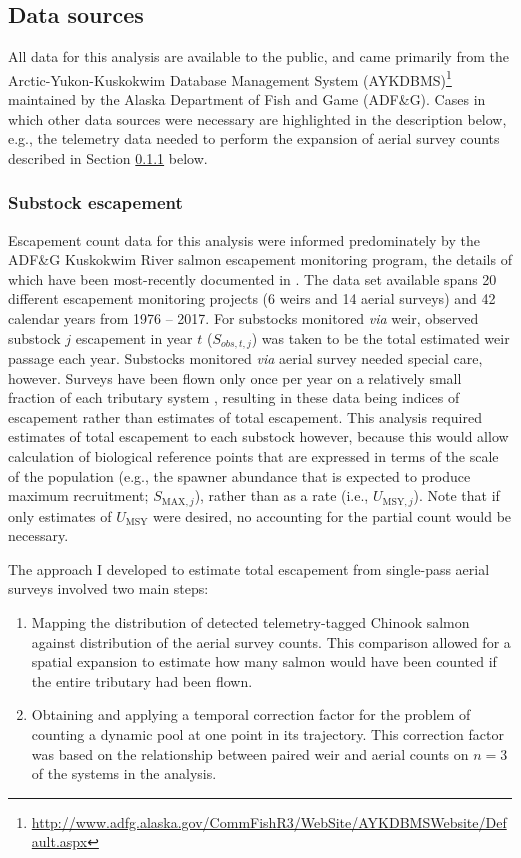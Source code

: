 \documentclass[12pt,]{book}
\let\rmarkdownfootnote\footnote%
\def\footnote{\protect\rmarkdownfootnote}
\theoremstyle{definition}
\theoremstyle{definition}
\theoremstyle{definition}
\theoremstyle{remark}
\begin{document}
\subsection{Data sources}\label{data-sources}

All data for this analysis are available to the public, and came
primarily from the Arctic-Yukon-Kuskokwim Database Management System
(AYKDBMS)\footnote{\url{http://www.adfg.alaska.gov/CommFishR3/WebSite/AYKDBMSWebsite/Default.aspx}}
maintained by the Alaska Department of Fish and Game (ADF\&G). Cases in
which other data sources were necessary are highlighted in the
description below, e.g., the telemetry data needed to perform the
expansion of aerial survey counts described in Section
\ref{air-expansion} below.

\subsubsection{Substock escapement}\label{air-expansion}

\noindent
Escapement count data for this analysis were informed predominately by
the ADF\&G Kuskokwim River salmon escapement monitoring program, the
details of which have been most-recently documented in
\citep{head-liller-2017}. The data set available spans 20 different
escapement monitoring projects (6 weirs and 14 aerial surveys) and 42
calendar years from 1976 -- 2017. For substocks monitored \emph{via}
weir, observed substock \(j\) escapement in year \(t\) (\(S_{obs,t,j}\))
was taken to be the total estimated weir passage each year. Substocks
monitored \emph{via} aerial survey needed special care, however. Surveys
have been flown only once per year on a relatively small fraction of
each tributary system \citep{head-liller-2017}, resulting in these data
being indices of escapement rather than estimates of total escapement.
This analysis required estimates of total escapement to each substock
however, because this would allow calculation of biological reference
points that are expressed in terms of the scale of the population (e.g.,
the spawner abundance that is expected to produce maximum recruitment;
\(S_{\text{MAX},j}\)), rather than as a rate (i.e.,
\(U_{\text{MSY},j}\)). Note that if only estimates of \(U_{\text{MSY}}\)
were desired, no accounting for the partial count would be necessary.

The approach I developed to estimate total escapement from single-pass
aerial surveys involved two main steps:

\begin{enumerate}
\def\labelenumi{(\arabic{enumi})}
\item
  Mapping the distribution of detected telemetry-tagged Chinook salmon
  against distribution of the aerial survey counts. This comparison
  allowed for a spatial expansion to estimate how many salmon would have
  been counted if the entire tributary had been flown.
\item
  Obtaining and applying a temporal correction factor for the problem of
  counting a dynamic pool at one point in its trajectory. This
  correction factor was based on the relationship between paired weir
  and aerial counts on \(n=3\) of the systems in the analysis.
\end{enumerate}
\end{document}
